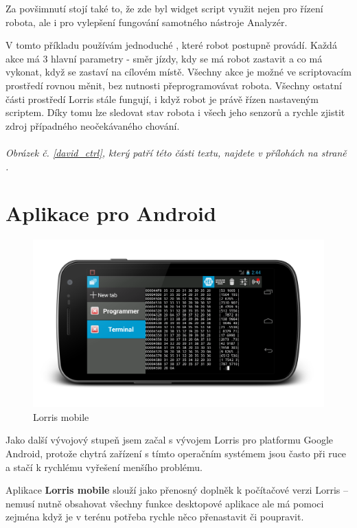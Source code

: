 \documentclass[12pt, a4paper, oneside]{article}
\newcommand{\It}{\textit}  %
\begin{document}
Za povšimnutí stojí také to, že zde byl widget script využit nejen pro řízení robota, ale i pro vylepšení fungování samotného nástroje Analyzér.

V tomto příkladu používám jednoduché , které robot postupně provádí. Každá akce má 3 hlavní parametry - směr jízdy, kdy se má robot zastavit a co má vykonat, když se zastaví na cílovém místě. Všechny akce je možné ve scriptovacím prostředí rovnou měnit, bez nutnosti přeprogramovávat robota. Všechny ostatní části prostředí Lorris stále fungují, i když robot je právě řízen nastaveným scriptem. Díky tomu lze sledovat stav robota i všech jeho senzorů a rychle zjistit zdroj případného neočekávaného chování.
\\
\\
\noindent\It{Obrázek č. \ref{david_ctrl}, který patří této části textu, najdete v přílohách na straně \pageref{david_ctrl}.}

\newpage
\section{Aplikace pro Android}
\begin{figure}[H]
\begin{center}
\includegraphics[width=\textwidth]{img/mobile.png}
\caption{Lorris mobile}
\end{center}
\end{figure}
Jako další vývojový stupeň jsem začal s vývojem Lorris pro platformu Google Android\cite{android}, protože chytrá zařízení s tímto operačním systémem jsou často při ruce a stačí k rychlému vyřešení menšího problému.

Aplikace {\bf Lorris mobile} slouží jako přenosný doplněk k počítačové verzi Lorris -- nemusí nutně obsahovat všechny funkce desktopové aplikace ale má pomoci zejména když je v terénu potřeba rychle něco přenastavit či poupravit.
\end{document}
